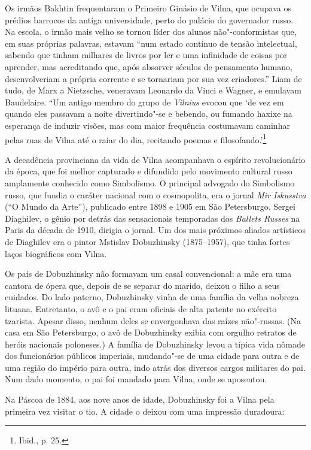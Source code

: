 Os irmãos Bakhtin frequentaram o Primeiro Ginásio de Vilna, que ocupava
os prédios barrocos da antiga universidade, perto do palácio do
governador russo. Na escola, o irmão mais velho se tornou líder dos
alunos não"-conformistas que, em suas próprias palavras, estavam ``num
estado contínuo de tensão intelectual, sabendo que tinham milhares de
livros por ler e uma infinidade de coisas por aprender, mas acreditando
que, após absorver séculos de pensamento humano, desenvolveriam a
própria corrente e se tornariam por sua vez criadores.'' Liam de tudo,
de Marx a Nietzsche, veneravam Leonardo da Vinci e Wagner, e emulavam
Baudelaire. ``Um antigo membro do grupo de \textit{Vilnius} evocou que `de vez em
quando eles passavam a noite divertindo"-se e bebendo, ou fumando haxixe
na esperança de induzir visões, mas com maior frequência costumavam
caminhar pelas ruas de Vilna até o raiar do dia, recitando poemas e
filosofando.'\footnote{Ibid., p. 25.}

\asterisc

A decadência provinciana da vida de Vilna acompanhava o espírito
revolucionário da época, que foi melhor capturado e difundido pelo
movimento cultural russo amplamente conhecido como Simbolismo. O
principal advogado do Simbolismo russo, que fundia o caráter nacional
com o cosmopolita, era o jornal \textit{Mir Iskusstva} (``O Mundo da
Arte''), publicado entre 1898 e 1905 em São Petersburgo. Sergei
Diaghilev, o gênio por detrás das sensacionais temporadas dos
\textit{Ballets Russes} na Paris da década de 1910, dirigia o jornal. Um
dos mais próximos aliados artísticos de Diaghilev era o pintor Mstislav
Dobuzhinsky (1875--1957), que tinha fortes laços biográficos com Vilna.

Os pais de Dobuzhinsky não formavam um casal convencional: a mãe era uma
cantora de ópera que, depois de se separar do marido, deixou o filho a
seus cuidados. Do lado paterno, Dobuzhinsky vinha de uma família da
velha nobreza lituana. Entretanto, o avô e o pai eram oficiais de alta
patente no exército tzarista. Apesar disso, nenhum deles se envergonhava
das raízes não"-russas. (Na casa em São Petersburgo, o avô de Dobuzhinsky
exibia com orgulho retratos de heróis nacionais poloneses.) A família de
Dobuzhinsky levou a típica vida nômade dos funcionários públicos
imperiais, mudando"-se de uma cidade para outra e de uma região do
império para outra, indo atrás dos diversos cargos militares do pai. Num
dado momento, o pai foi mandado para Vilna, onde se aposentou.

Na Páscoa de 1884, aos nove anos de idade, Dobuzhinsky foi a Vilna pela
primeira vez visitar o tio. A cidade o deixou com uma impressão
duradoura:

